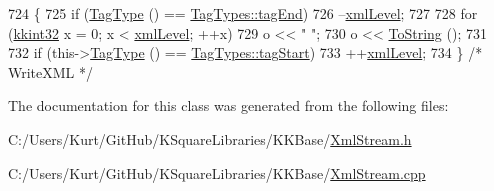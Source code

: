 \begin{DoxyCode}
724 \{
725   \textcolor{keywordflow}{if}  (\hyperlink{class_k_k_b_1_1_xml_tag_abe56f7d7b736e627d3a9a584ff965b1e}{TagType} () == \hyperlink{class_k_k_b_1_1_xml_tag_a6c0ef0e23f982f49d55d4fb7eaff6ac9a3ceaa9a790f688ec97a35b5a3fd3b164}{TagTypes::tagEnd})
726     --\hyperlink{_xml_stream_8cpp_ad1d6b8ca8fb61d14719c4c25c9ada3d7}{xmlLevel};
727 
728   \textcolor{keywordflow}{for}  (\hyperlink{namespace_k_k_b_a8fa4952cc84fda1de4bec1fbdd8d5b1b}{kkint32} x = 0;  x < \hyperlink{_xml_stream_8cpp_ad1d6b8ca8fb61d14719c4c25c9ada3d7}{xmlLevel};  ++x)
729     o << \textcolor{stringliteral}{"  "};
730   o << \hyperlink{class_k_k_b_1_1_xml_tag_ac2edd74085cdd50465096426f1ef9e44}{ToString} ();
731 
732   \textcolor{keywordflow}{if}  (this->\hyperlink{class_k_k_b_1_1_xml_tag_abe56f7d7b736e627d3a9a584ff965b1e}{TagType} () == \hyperlink{class_k_k_b_1_1_xml_tag_a6c0ef0e23f982f49d55d4fb7eaff6ac9ab02b23b5e15b3a1353771313e1176ce0}{TagTypes::tagStart})
733     ++\hyperlink{_xml_stream_8cpp_ad1d6b8ca8fb61d14719c4c25c9ada3d7}{xmlLevel};
734 \}  \textcolor{comment}{/* WriteXML */}
\end{DoxyCode}


The documentation for this class was generated from the following files\+:\begin{DoxyCompactItemize}
\item 
C\+:/\+Users/\+Kurt/\+Git\+Hub/\+K\+Square\+Libraries/\+K\+K\+Base/\hyperlink{_xml_stream_8h}{Xml\+Stream.\+h}\item 
C\+:/\+Users/\+Kurt/\+Git\+Hub/\+K\+Square\+Libraries/\+K\+K\+Base/\hyperlink{_xml_stream_8cpp}{Xml\+Stream.\+cpp}\end{DoxyCompactItemize}
